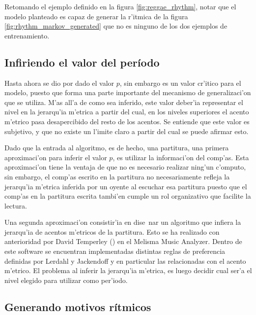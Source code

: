 Retomando el ejemplo definido en la figura \ref{fig:reggae_rhythm}, notar que el modelo planteado es capaz de generar la r'itmica de la figura \ref{fig:rhythm_markov_generated}
que no es ninguno de los dos ejemplos de entrenamiento.

\begin{imagen}
\end{imagen}


\subsection{Infiriendo el valor del per\'iodo}
Hasta ahora se dio por dado el valor $p$, sin embargo es un valor cr'itico para el modelo, puesto que forma una parte importante del mecanismo de generalizaci'on que se 
utiliza. M'as all'a de como sea inferido, este valor deber'ia representar el nivel en la jerarqu'ia m'etrica a partir del cual, en los niveles superiores el acento m'etrico 
pasa desapercibido del resto de los acentos. Se entiende que este valor es subjetivo, y que no existe un l'imite claro a partir del cual se puede afirmar esto.

Dado que la entrada al algoritmo, es de hecho, una partitura, una primera aproximaci'on para inferir el valor $p$, es utilizar la informaci'on del comp'as. 
Esta aproximaci'on tiene la ventaja de que no es necesario realizar ning'un c'omputo, sin embargo, el comp'as escrito en la partitura no necesariamente refleja la jerarqu'ia
m'etrica inferida por un oyente al escuchar esa partitura puesto que el comp'as en la partitura escrita tambi'en cumple un rol organizativo que facilite la lectura. 

Una segunda aproximaci'on consistir'ia en dise~nar un algoritmo que infiera la jerarqu'ia de acentos m'etricos de la partitura. Esto se ha realizado con anterioridad por
David Temperley (\cita) en el Melisma Music Analyzer. Dentro de este software se encuentran implementadas distintas reglas de preferencia definidas por Lerdahl y Jackendoff y 
en particular las relacionadas con el acento m'etrico. El problema al inferir la jerarqu'ia m'etrica, es luego decidir cual ser'a el nivel elegido para utilizar como per'iodo.

\subsection{Generando motivos r\'itmicos}

